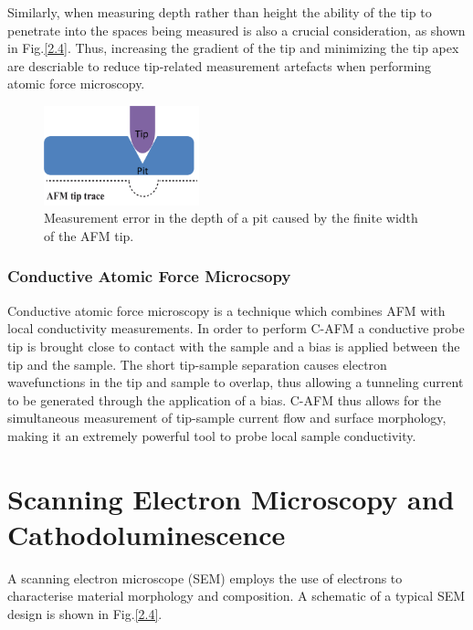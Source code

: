 Similarly, when measuring depth rather than height the ability of the tip to penetrate into the spaces being measured is also a crucial consideration, as shown in Fig.\ref{2.4}. Thus, increasing the gradient of the tip and minimizing the tip apex are descriable to reduce tip-related measurement artefacts when performing atomic force microscopy.

\begin{figure}[h]
	\centering
	\includegraphics[width=0.4\textwidth]{Figs/Ch2/afm3.png}
	\caption {Measurement error in the depth of a pit caused by the finite width of the AFM tip.}
\end{figure}
\FloatBarrier

\subsubsection{Conductive Atomic Force Microcsopy}

Conductive atomic force microscopy  is a technique which combines AFM with local conductivity measurements. In order to perform C-AFM a conductive probe tip is brought close to contact with the sample and a bias is applied between the tip and the sample. The short tip-sample separation causes electron wavefunctions in the tip and sample to overlap, thus allowing a tunneling current to be generated through the application of a bias. C-AFM thus allows for the simultaneous measurement of tip-sample current flow and surface morphology, making it an extremely powerful tool to probe local sample conductivity. 




\section{Scanning Electron Microscopy and Cathodoluminescence}

A scanning electron microscope   (SEM) employs the use of electrons to characterise material morphology and composition. A schematic of a typical SEM design is shown in Fig.\ref{2.4}.

